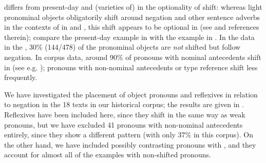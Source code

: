 \documentclass[output=paper]{langscibook}
\begin{document}
 differs from present-day  and (varieties of)  in the optionality of  shift: whereas light pronominal objects obligatorily shift around negation and other sentence adverbs in the contexts of   in  and , this shift appears to be optional in  (see \citealt{Bentzen2014} and references therein); compare the present-day  example in  with the  example in . In the  data in the  \citep{LundquistEtAl2019}, 30\% (144/478) of the pronominal objects are \textit{not} shifted but follow negation. In corpus data, around 90\% of pronouns with nominal antecedents shift in  (see e.g. \citealt{Andreasson2008}); pronouns with non-nominal antecedents or type reference shift less frequently.


\ea\label{ex:lalu:51}

\z
\z


We have investigated the placement of object pronouns and reflexives in relation to negation in the 18 texts in our historical corpus; the results are given in . Reflexives have been included here, since they shift in the same way as weak pronouns, but we have excluded 41 pronouns with non-nominal antecedents entirely, since they show a different pattern (with only 37\%  in this corpus). On the other hand, we have included possibly contrasting pronouns with , and they account for almost all of the examples with non-shifted pronouns.
\end{document}
